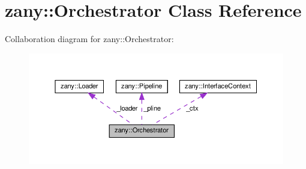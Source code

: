 \hypertarget{classzany_1_1_orchestrator}{}\section{zany\+:\+:Orchestrator Class Reference}
\label{classzany_1_1_orchestrator}


Collaboration diagram for zany\+:\+:Orchestrator\+:
\nopagebreak
\begin{figure}[H]
\begin{center}
\leavevmode
\includegraphics[width=350pt]{classzany_1_1_orchestrator__coll__graph}
\end{center}
\end{figure}
